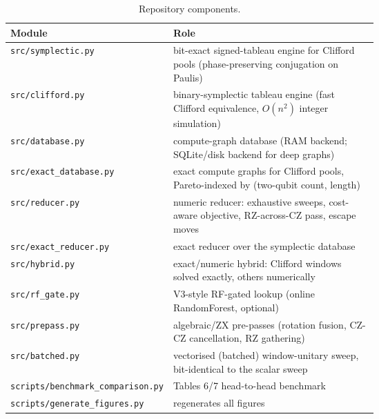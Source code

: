 \documentclass[11pt,a4paper]{article}
\begin{document}
\begin{table}[H]
\centering
\caption{Repository components.}
\label{tab:modules}
\begin{tabular}{lp{0.62\linewidth}}
\toprule
Module & Role \\
\midrule
\texttt{src/symplectic.py} & bit-exact signed-tableau engine for Clifford pools (phase-preserving conjugation on Paulis) \\
\texttt{src/clifford.py} & binary-symplectic tableau engine (fast Clifford equivalence, $O(n^2)$ integer simulation) \\
\texttt{src/database.py} & compute-graph database (RAM backend; SQLite/disk backend for deep graphs) \\
\texttt{src/exact\_database.py} & exact compute graphs for Clifford pools, Pareto-indexed by (two-qubit count, length) \\
\texttt{src/reducer.py} & numeric reducer: exhaustive sweeps, cost-aware objective, RZ-across-CZ pass, escape moves \\
\texttt{src/exact\_reducer.py} & exact reducer over the symplectic database \\
\texttt{src/hybrid.py} & exact/numeric hybrid: Clifford windows solved exactly, others numerically \\
\texttt{src/rf\_gate.py} & V3-style RF-gated lookup (online RandomForest, optional) \\
\texttt{src/prepass.py} & algebraic/ZX pre-passes (rotation fusion, CZ-CZ cancellation, RZ gathering) \\
\texttt{src/batched.py} & vectorised (batched) window-unitary sweep, bit-identical to the scalar sweep \\
\texttt{scripts/benchmark\_comparison.py} & Tables 6/7 head-to-head benchmark \\
\texttt{scripts/generate\_figures.py} & regenerates all figures \\
\bottomrule
\end{tabular}
\end{table}
\end{document}
